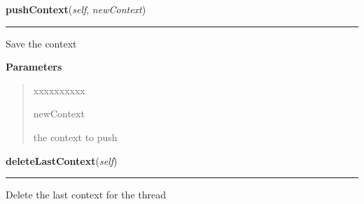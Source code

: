     \label{tracetool:TraceToSend:pushContext}

    \vspace{0.5ex}

\hspace{.8\funcindent}\begin{boxedminipage}{\funcwidth}

    \raggedright \textbf{pushContext}(\textit{self}, \textit{newContext})

    \vspace{-1.5ex}

    \rule{\textwidth}{0.5\fboxrule}
\setlength{\parskip}{2ex}
    Save the context

\setlength{\parskip}{1ex}
      \textbf{Parameters}
      \vspace{-1ex}

      \begin{quote}
        \begin{Ventry}{xxxxxxxxxx}

          \item[newContext]

          the context to push

        \end{Ventry}

      \end{quote}

    \end{boxedminipage}

    \label{tracetool:TraceToSend:deleteLastContext}

    \vspace{0.5ex}

\hspace{.8\funcindent}\begin{boxedminipage}{\funcwidth}

    \raggedright \textbf{deleteLastContext}(\textit{self})

    \vspace{-1.5ex}

    \rule{\textwidth}{0.5\fboxrule}
\setlength{\parskip}{2ex}
    Delete the last context for the thread

\setlength{\parskip}{1ex}
    \end{boxedminipage}

